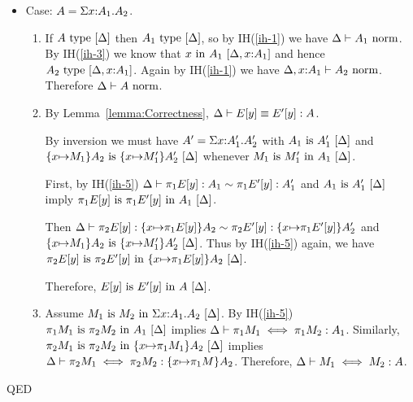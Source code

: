 \documentclass{article}
\theoremstyle{break}
\newcommand{\qed}{\mbox{QED}}
\newenvironment{proof}{\noindent{\bf Proof:}\hspace*{0.5em}}{\hspace*{\fill}\qed}
\begin{document}
\begin{proof}
\begin{itemize}
\begin{enumerate}
\end{enumerate}



\item Case: $\kind=\ksigma{\cvar}{\kind_1}{\kind_2}$.
\begin{enumerate}
\item If $\semanticvalidtype{\world}{\kind}$ then
$\semanticvalidtype{\world}{\kind_1}$, so by IH(\ref{ih-1}) we
have $\normtype{\world}{\kind_1}$.  By IH(\ref{ih-3}) we know
that $\semanticvalidterm{\world,\cvar{:}{\kind_1}}{\cvar}{\kind_1}$
and hence $\semanticvalidtype{\world,\cvar{:}\kind_1}{\kind_2}$.
Again by IH(\ref{ih-1}) we have
$\normtype{\world,\cvar{:}\kind_1}{\kind_2}$.  Therefore 
$\normtype{\world}{\kind}$.

\item By Lemma~\ref{lemma:Correctness}, 
$\equivconstructor{\world}{E[\othercvar]}{E'[\othercvar]}{\kind}$.

By inversion we must have $\kind'=\ksigma{\cvar}{\kind'_1}{\kind'_2}$ with
$\semanticequivtype{\world}{\kind_1}{\kind'_1}$ and
$\semanticequivtype{\world}{\substitute{\cvar}{\constructor_1}{\kind_2}}
   {\substitute{\cvar}{\constructor'_1}{\kind'_2}}$ whenever
$\semanticequivterm{\world}{\constructor_1}{\constructor'_1}{\kind_1}$.

First, by IH(\ref{ih-5})
$\weakconequiv{\world}{\cpi{1}{E[\othercvar]}}{\kind_1}{\cpi{1}{E'[\othercvar]}}{\kind'_1}$ and
$\semanticequivtype{\world}{\kind_1}{\kind'_1}$ imply
$\semanticequivterm{\world}{\cpi{1}{E[\othercvar]}}{\cpi{1}{E'[\othercvar]}}{\kind_1}$.

Then
$\weakconequiv{\world}{\cpi{2}{E[\othercvar]}}{\substitute{\cvar}{\cpi{1}{E[\othercvar]}}{\kind_2}}
    {\cpi{2}{E'[\othercvar]}}{\substitute{\cvar}{\cpi{1}{E'[\othercvar]}}{\kind'_2}}$
and
$\semanticequivtype{\world}{\substitute{\cvar}{\constructor_1}{\kind_2}}
   {\substitute{\cvar}{\constructor'_1}{\kind'_2}}$.
Thus by IH(\ref{ih-5}) again, we have
$\semanticequivterm{\world}{\cpi{2}{E[\othercvar]}}{\cpi{2}{E'[\othercvar]}}
   {\substitute{\cvar}{\cpi{1}{E[\othercvar]}}{\kind_2}}$.

Therefore, $\semanticequivterm{\world}{E[\othercvar]}{E'[\othercvar]}{\kind}$.

\item Assume $\semanticequivterm{\world}{\constructor_1}{\constructor_2}{\ksigma{\cvar}{\kind_1}{\kind_2}}$.
By IH(\ref{ih-5})
$\semanticequivterm{\world}{\cpi{1}{\constructor_1}}{\cpi{2}{\constructor_2}}{\kind_1}$ implies
$\aconequiv{\world}{\cpi{1}{\constructor_1}}{\cpi{1}{\constructor_2}}{\kind_1}$.  Similarly,
$\semanticequivterm{\world}{\cpi{2}{\constructor_1}}{\cpi{2}{\constructor_2}}
    {\substitute{\cvar}{\cpi{1}{\constructor_1}}{\kind_2}}$ implies
$\aconequiv{\world}{\cpi{2}{\constructor_1}}{\cpi{2}{\constructor_2}}
    {\substitute{\cvar}{\cpi{1}{\constructor}}{\kind_2}}$.
Therefore, $\aconequiv{\world}{\constructor_1}{\constructor_2}{\kind}$.
\end{enumerate}
\end{itemize}
\end{proof}
\end{document}
